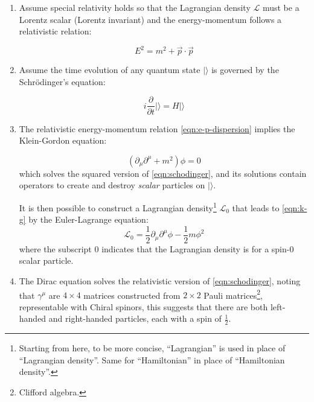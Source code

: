 \begin{enumerate}
    \item Assume special relativity holds so that the Lagrangian density
        $\mathcal{L}$
        must be a Lorentz scalar (Lorentz invariant) and the
        energy-momentum follows a relativistic relation:

        \begin{equation}
            E^2 = m^2 + \vec{p} \cdot \vec{p}
            \label{eqn:e-p-dispersion}
        \end{equation}

    \item Assume the time evolution of any quantum state $| \rangle$ is governed
        by the Schrödinger's equation:

        \begin{equation}
            i \frac{\partial}{\partial t} | \rangle = H | \rangle
            \label{eqn:schodinger}
        \end{equation}

    \item The relativistic energy-momentum relation \cref{eqn:e-p-dispersion}
        implies the Klein-Gordon equation:

        \begin{equation}
            (\partial_\mu \partial^\mu + m^2) \phi = 0
            \label{eqn:k-g}
        \end{equation}
        which solves the squared version of \cref{eqn:schodinger},
        and its solutions contain operators to create and destroy \emph{scalar}
        particles on $| \rangle$.

        It is then possible to construct a Lagrangian density\footnote{
            Starting from here, to be more concise, ``Lagrangian'' is used
            in place of ``Lagrangian density''.
            Same for ``Hamiltonian'' in place of ``Hamiltonian density''.
        } $\mathcal{L}_0$
        that leads to \cref{eqn:k-g} by the Euler-Lagrange equation:
        \begin{equation}
            \mathcal{L}_0 = \frac{1}{2} \partial_\mu \partial^\mu \phi -
                \frac{1}{2} m \phi^2
        \end{equation}
        where the subscript 0 indicates that the Lagrangian density is for a
        spin-0 scalar particle.

    \item The Dirac equation solves the relativistic version of
        \cref{eqn:schodinger},
        noting that $\gamma^\mu$ are $4 \times 4$ matrices constructed from
        $2 \times 2$ Pauli matrices\footnote{
            Clifford algebra.
        },
        representable with Chiral spinors,
        this suggests that there are both left-handed and right-handed particles,
        each with a spin of $\frac{1}{2}$.


\end{enumerate}
